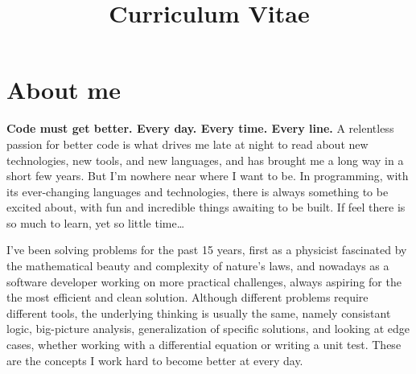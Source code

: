 \documentclass[11pt,a4paper,sans]{moderncv}        %
\title{Curriculum Vitae}                               %
\begin{document}
\makecvtitle

\section{About me}

    \textbf{Code must get better. Every day. Every time. Every line.} A relentless passion for better code is what drives
     me late at night to read about new technologies, new tools, and new languages, and has brought me a long way in a short few years.
     But I'm nowhere near where I want to be. In programming, with its ever-changing languages and technologies, there is always something to be excited about,
     with fun and incredible things awaiting to be built. If feel there is so much to learn, yet so little time\ldots \newline{}


    I've been solving problems for the past 15 years, first as a physicist fascinated by the mathematical beauty and complexity of nature's laws, and nowadays as a software
    developer working on more practical challenges, always aspiring for the the most efficient and clean solution. Although different problems require different tools, the underlying thinking
    is usually the same, namely consistant logic, big-picture analysis, generalization of specific solutions, and looking at edge cases, whether working with a
    differential equation or writing a unit test. These are the concepts I work hard to become better at every day.

\nopagebreak[4]
\end{document}
